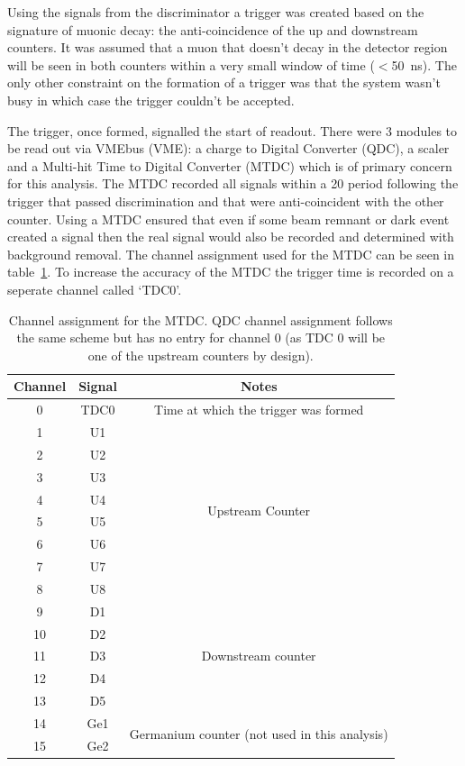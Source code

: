 Using the signals from the discriminator a trigger was created based on the signature of muonic decay: the anti-coincidence of the up and downstream counters. It was assumed that a muon that doesn't decay in the detector region will be seen in both counters within a very small window of time ($<$50~ns). The only other constraint on the formation of a trigger was that the system wasn't busy in which case the trigger couldn't be accepted.

The trigger, once formed, signalled the start of readout. There were 3 modules to be read out via VMEbus (VME): a charge to Digital Converter (QDC), a scaler and a Multi-hit Time to Digital Converter (MTDC) which is of primary concern for this analysis. The MTDC recorded all signals  within a 20\mus{} period following the trigger that passed discrimination and that were anti-coincident with the other counter. Using a MTDC ensured that even if some beam remnant or dark event created a signal then the real signal would also be recorded and determined with background removal. The channel assignment used for the MTDC can be seen in table~\ref{tab:mtdc_ch}. To increase the accuracy of the MTDC the trigger time is recorded on a seperate channel called `TDC0'.
\begin{table}
    \begin{center}
    \begin{tabular}{c|c|c}
        Channel & Signal & Notes\\
        \hline
        0  & TDC0 & Time at which the trigger was formed \\
        \hline
        1  & U1   & \multirow{8}{*}{Upstream Counter}\\
        2  & U2   & \\
        3  & U3   & \\
        4  & U4   & \\
        5  & U5   & \\
        6  & U6   & \\
        7  & U7   & \\
        8  & U8   & \\
        \hline
        9  & D1   & \multirow{5}{*}{Downstream counter}\\
        10 & D2   & \\
        11 & D3   & \\
        12 & D4   & \\
        13 & D5   & \\
        \hline
        14 & Ge1  & \multirow{2}{*}{Germanium counter (not used in this analysis)}\\
        15 & Ge2  & \\
    \end{tabular}
    \end{center}
    \caption{Channel assignment for the MTDC. QDC channel assignment follows the same scheme but has no entry for channel 0 (as TDC 0 will be one of the upstream counters by design).}
    \label{tab:mtdc_ch}
\end{table}

